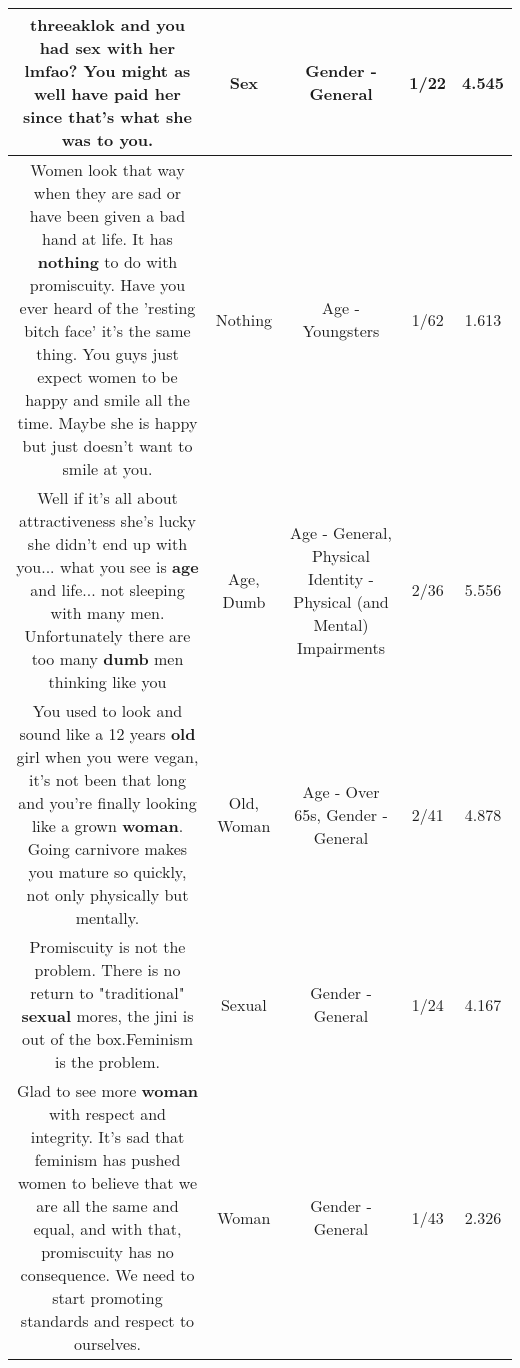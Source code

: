 \documentclass[11pt]{article}
\newlength\mylength
\begin{document}
\begin{center}
\begin{longtable}{|C{.65\mylength}|C{.30\mylength}|C{.12\mylength}|C{.12\mylength}|C{.12\mylength}|}
  \small threeaklok and you had \textbf{sex} with her lmfao? You might as well have paid her since that's what she was to you.\normalsize   & Sex & Gender - General & 1/22 & 4.545 \\  \hline
  \small Women look that way when they are sad or have been given a bad hand at life. It has \textbf{nothing} to do with promiscuity. Have you ever heard of the 'resting bitch face' it's the same thing. You guys just expect women to be happy and smile all the time. Maybe she is happy but just doesn't want to smile at you.\normalsize   & Nothing & Age - Youngsters & 1/62 & 1.613 \\  \hline
  \small Well if it's all about attractiveness she's lucky she didn't end up with you... what you see is \textbf{age} and life... not sleeping with many men. Unfortunately there are too many \textbf{dumb} men thinking like you\normalsize   & Age, Dumb & Age - General, Physical Identity - Physical (and Mental) Impairments & 2/36 & 5.556 \\  \hline
  \small You used to look and sound like a 12 years \textbf{old} girl when you were vegan, it's not been that long and you're finally looking like a grown \textbf{woman}. Going carnivore makes you mature so quickly, not only physically but mentally.\normalsize   & Old, Woman & Age - Over 65s, Gender - General & 2/41 & 4.878 \\  \hline
  \small Promiscuity is not the problem. There is no return to "traditional" \textbf{sexual} mores, the jini is out of the box.Feminism is the problem.\normalsize   & Sexual & Gender - General & 1/24 & 4.167 \\  \hline
  \small Glad to see more \textbf{woman} with respect and integrity. It's sad that feminism has pushed women to believe that we are all the same and equal, and with that, promiscuity has no consequence.  We need to start promoting standards and respect to ourselves.\normalsize   & Woman & Gender - General & 1/43 & 2.326 \\  \hline

\end{longtable}
\end{center}
\end{document}

